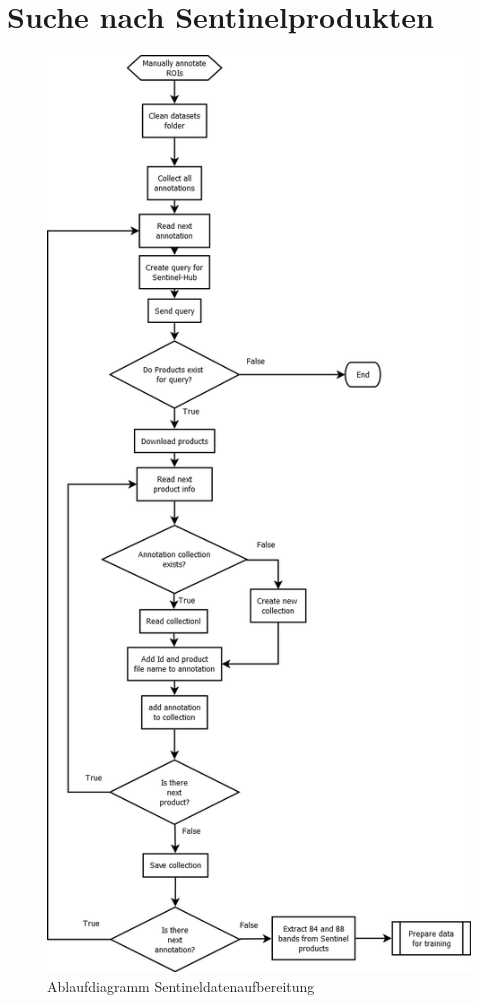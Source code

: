 \section{Suche nach Sentinelprodukten}

\begin{figure}[H]
  \centering
  \includegraphics[height=0.75\textheight]{pics/get-products.png}
  \caption{Ablaufdiagramm Sentineldatenaufbereitung}
  \label{fig:get-products}
\end{figure}

